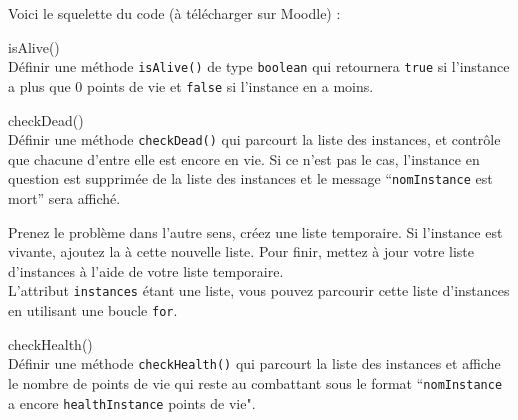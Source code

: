Voici le squelette du code (à télécharger sur Moodle) :

\begin{Exercice}[5 minutes] isAlive()\\
    Définir une méthode \lstinline{isAlive()} de type \lstinline{boolean} qui retournera \lstinline{true} si l'instance a plus que 0 points de vie et \lstinline{false} si l'instance en a moins.
\begin{solution}
	
\end{solution}
\end{Exercice}
\begin{Exercice}[10 minutes] checkDead()\\
    Définir une méthode \lstinline{checkDead()} qui parcourt la liste des instances, et contrôle que chacune d'entre elle est encore en vie. Si ce n'est pas le cas, l'instance en question est supprimée de la liste des instances et le message ``\lstinline{nomInstance} est mort'' sera affiché.
    
\begin{conseil}
Prenez le problème dans l'autre sens, créez une liste temporaire. Si l'instance est vivante, ajoutez la à cette nouvelle liste. Pour finir, mettez à jour votre liste d'instances à l'aide de votre liste temporaire.\\
L'attribut \lstinline{instances} étant une liste, vous pouvez parcourir cette liste d'instances en utilisant une boucle \lstinline{for}. 
\end{conseil}
\begin{solution}
	
\end{solution}
\end{Exercice}
\begin{Exercice}[5 minutes] checkHealth()\\
    Définir une méthode \lstinline{checkHealth()} qui parcourt la liste des instances et affiche le nombre de points de vie qui reste au combattant sous le format ``\lstinline{nomInstance} a encore \lstinline{healthInstance} points de vie". 
\begin{solution}
	
\end{solution}
\end{Exercice}
